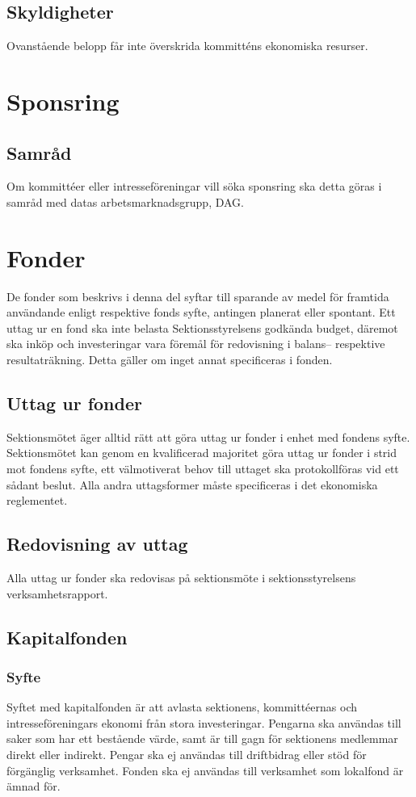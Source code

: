\documentclass[a4paper]{dtek}
\begin{document}
\subsection{Skyldigheter}
Ovanstående belopp får inte överskrida kommitténs ekonomiska resurser. \\
\section{Sponsring}
\subsection{Samråd}
Om kommittéer eller intresseföreningar vill söka sponsring ska detta göras i samråd med datas arbetsmarknadsgrupp, DAG.
\section{Fonder}
De fonder som beskrivs i denna del syftar till sparande av medel för framtida användande enligt respektive fonds syfte, antingen planerat eller spontant. Ett uttag ur en fond ska inte belasta Sektionsstyrelsens godkända budget, däremot ska inköp och investeringar vara föremål för redovisning i balans– respektive resultaträkning. Detta gäller om inget annat specificeras i fonden.

\subsection{Uttag ur fonder}
Sektionsmötet äger alltid rätt att göra uttag ur fonder i enhet med fondens syfte. Sektionsmötet kan genom en kvalificerad majoritet göra uttag ur fonder i strid mot fondens syfte, ett välmotiverat behov till uttaget ska protokollföras vid ett sådant beslut. Alla andra uttagsformer måste specificeras i det ekonomiska reglementet.

\subsection{Redovisning av uttag}
Alla uttag ur fonder ska redovisas på sektionsmöte i sektionsstyrelsens verksamhetsrapport.

\subsection{Kapitalfonden}
\subsubsection{Syfte}
\label{sec:kapitalfond_syfte}
Syftet med kapitalfonden är att avlasta sektionens, kommittéernas och intresseföreningars ekonomi från stora investeringar. Pengarna ska användas till saker som har ett bestående värde, samt är till gagn för sektionens medlemmar direkt eller indirekt. Pengar ska ej användas till driftbidrag eller stöd för förgänglig verksamhet. Fonden ska ej användas till verksamhet som lokalfond är ämnad för.
\end{document}
